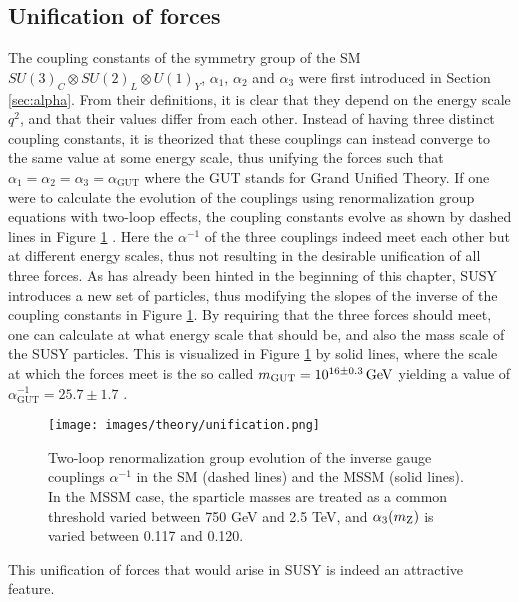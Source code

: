 \subsection*{Unification of forces}
\noindent\justify
The coupling constants of the symmetry group of the SM $SU(3)_{C}\otimes SU(2)_{L}\otimes U(1)_{Y}$, $\alpha_{1}$, $\alpha_{2}$ and $\alpha_{3}$ were first introduced in Section \ref{sec:alpha}. 
From their definitions, it is clear that they depend on the energy scale $q^{2}$, and that their values differ from each other. 
Instead of having three distinct coupling constants, it is theorized that these couplings can instead converge to the same value at some energy scale, thus unifying the forces such that $\alpha_{1}=\alpha_{2}=\alpha_{3}=\alpha_{\mathrm{GUT}}$ where the GUT stands for Grand Unified Theory. 
If one were to calculate the evolution of the couplings using renormalization group equations with two-loop effects, the coupling constants evolve as shown by dashed lines in Figure \ref{fig:unification} \cite{Martin:1997ns}.
Here the $\alpha^{-1}$ of the three couplings indeed meet each other but at different energy scales, thus not resulting in the desirable unification of all three forces.   
\newpara
\noindent\justify
As has already been hinted in the beginning of this chapter, SUSY introduces a new set of particles, thus modifying the slopes of the inverse of the coupling constants in Figure \ref{fig:unification}.
By requiring that the three forces should meet, one can calculate at what energy scale that should be, and also the mass scale of the SUSY particles. 
This is visualized in Figure \ref{fig:unification} by solid lines, where the scale at which the forces meet is the so called $m_{\mathrm{GUT}}=10^{16\pm 0.3}\,\text{Ge\hspace{-.08em}V}$ yielding a value of $\alpha_{\mathrm{GUT}}^{-1}=25.7\pm1.7$ \cite{Amaldi:1991cn}. 
\begin{figure}[htbp!]
\begin{center}
    \texttt{[image: images/theory/unification.png]}
    \caption{Two-loop renormalization group evolution of the inverse gauge couplings $\alpha^{-1}$ in the SM (dashed lines) and the MSSM (solid lines). 
In the MSSM case, the sparticle masses are treated as a common threshold varied between 750 GeV and 2.5 TeV, and $\alpha_{3}(m_{\mathrm{Z}})$ is varied between 0.117 and 0.120. \cite{Martin:1997ns}}
\label{fig:unification}
\end{center}
\end{figure}                                                                         
This unification of forces that would arise in SUSY is indeed an attractive feature. 
